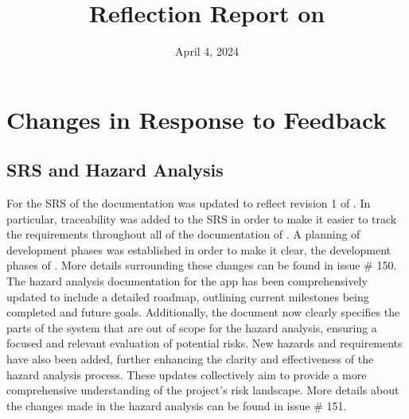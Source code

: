 \documentclass{article}
\title{Reflection Report on \progname}
\author{\authname}
\date{April 4, 2024}
\begin{document}
\maketitle


\section{Changes in Response to Feedback}




\subsection{SRS and Hazard Analysis}

For the SRS of \progname{} the documentation was updated to reflect revision 1 of \progname{}. In particular, traceability was added to the SRS in order to make it easier to track the requirements throughout all of the documentation of \progname{}. A planning of development phases was established in order to make it clear, the development phases of \progname{}. More details surrounding these changes can be found in issue \# 150.\\

The hazard analysis documentation for the \progname{} app has been comprehensively updated to include a detailed roadmap, outlining current milestones being completed and future goals. Additionally, the document now clearly specifies the parts of the system that are out of scope for the hazard analysis, ensuring a focused and relevant evaluation of potential risks. New hazards and requirements have also been added, further enhancing the clarity and effectiveness of the hazard analysis process. These updates collectively aim to provide a more comprehensive understanding of the project's risk landscape. More details about the changes made in the hazard analysis can be found in issue \# 151.
\end{document}
